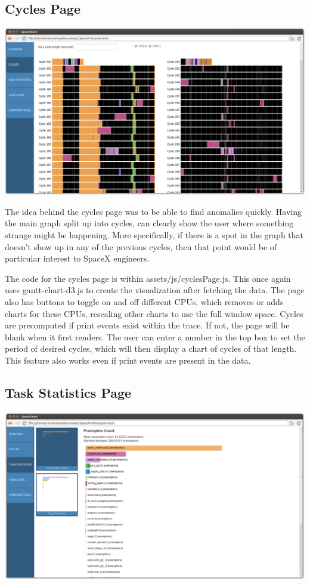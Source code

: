 \documentclass{hmcclinic}
\begin{document}
  \subsection{Cycles Page} %

  \includegraphics[scale=0.25]{cycles-page.png}
  
The idea behind the cycles page was to be able to find anomalies quickly. Having the main graph split up into cycles, can clearly show the user where something strange might be happening. More specifically, if there is a spot in the graph that doesn't show up in any of the previous cycles, then that point would be of particular interest to SpaceX engineers.

    The code for the cycles page is within assets/js/cyclesPage.js. This once again
    uses gantt-chart-d3.js to create the visualization after fetching the data.
    The page also has buttons to toggle on and off different CPUs, which removes
    or adds charts for these CPUs, rescaling other charts to use the full window
    space. Cycles are precomputed if print events exist within the trace. If
    not, the page will be blank when it first renders. The user can enter a
    number in the top box to set the period of desired cycles, which will then
    display a chart of cycles of that length. This feature also works even if
    print events are present in the data.
  
  \subsection{Task Statistics Page} %

  \includegraphics[scale=0.25]{task-statistics-page.png}
\end{document}
